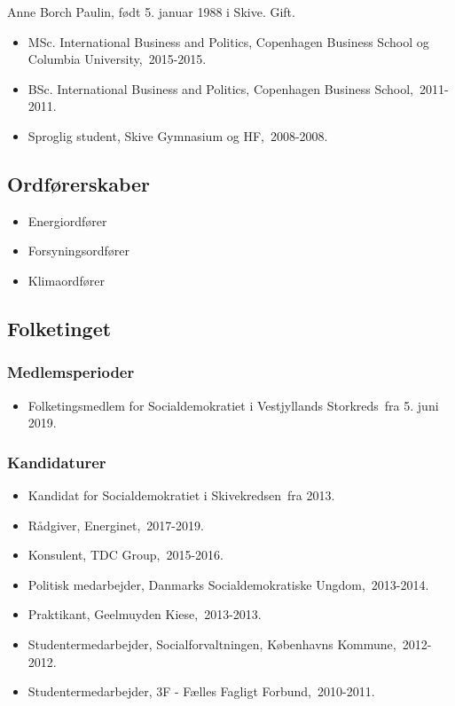 \documentclass[11pt, a4paper]{awesome-cv}
\begin{document}
\makecvheader[R]
\makelettertitle
\begin{cvletter}
Anne Borch Paulin, født 5. januar 1988 i Skive. Gift.

\begin{itemize}
\item MSc. International Business and Politics, Copenhagen Business School og Columbia University, 2015-2015.
\item BSc. International Business and Politics, Copenhagen Business School, 2011-2011.
\item Sproglig student, Skive Gymnasium og HF, 2008-2008.
\end{itemize}
\subsection*{Ordførerskaber}
\begin{itemize}
\item Energiordfører
\item Forsyningsordfører
\item Klimaordfører
\end{itemize}
\subsection*{Folketinget}
\subsubsection*{Medlemsperioder}
\begin{itemize}
\item Folketingsmedlem for Socialdemokratiet i Vestjyllands Storkreds fra 5. juni 2019.
\end{itemize}
\subsubsection*{Kandidaturer}
\begin{itemize}
\item Kandidat for Socialdemokratiet i Skivekredsen fra 2013.
\end{itemize}
\begin{itemize}
\item Rådgiver, Energinet, 2017-2019.
\item Konsulent, TDC Group, 2015-2016.
\item Politisk medarbejder, Danmarks Socialdemokratiske Ungdom, 2013-2014.
\item Praktikant, Geelmuyden Kiese, 2013-2013.
\item Studentermedarbejder, Socialforvaltningen, Københavns Kommune, 2012-2012.
\item Studentermedarbejder, 3F - Fælles Fagligt Forbund, 2010-2011.
\end{itemize}
\end{cvletter}
\end{document}
